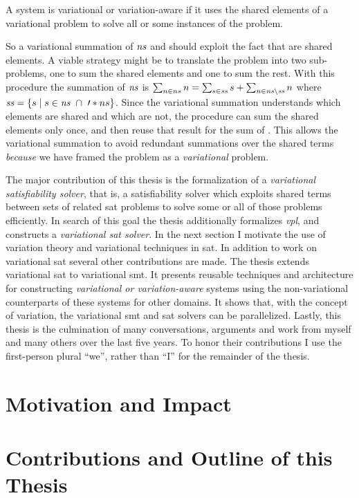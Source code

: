 \begin{definition}
  A system is variational or variation-aware if it uses the shared elements of a
  variational problem to solve all or some instances of the problem.
\end{definition}
%
So a variational summation of $\mathit{ns}$ and  should exploit the fact
that  are shared elements. A viable strategy might be to translate
the problem into two sub-problems, one to sum the shared elements and one to sum
the rest. With this procedure the summation of $\mathit{ns}$ is $\sum_{n \in{} ns} n
= \sum_{s \in{} \mathit{ss}} s + \sum_{n \in{} \mathit{ns} \setminus{} \mathit{ss}} n$ where
$\kf{ss} = \setc{s}{s \in{} \kf{ns}\ \cap{}\ \prime*{ns}}$. Since the
variational summation understands which elements are shared and which are not,
the procedure can sum the shared elements only once, and then reuse that result
for the sum of . This allows the variational summation to avoid
redundant summations over the shared terms \emph{because} we have framed the
problem as a \emph{variational} problem.

The major contribution of this thesis is the formalization of a
\emph{variational satisfiability solver}, that is, a satisfiability solver which
exploits shared terms between sets of related \acl{sat} problems to solve some
or all of those problems efficiently. In search of this goal the thesis
additionally formalizes \emph{\acl{vpl}}, and constructs a \emph{variational
  \ac{sat} solver}. In the next section I motivate the use of variation theory
and variational techniques in \acl{sat}. In addition to work on variational
\ac{sat} several other contributions are made. The thesis extends variational
\acl{sat} to variational \ac{smt}. It presents reusable techniques and
architecture for constructing \emph{variational or variation-aware} systems
using the non-variational counterparts of these systems for other domains. It
shows that, with the concept of variation, the variational \ac{smt} and \ac{sat}
solvers can be parallelized. Lastly, this thesis is the culmination of many
conversations, arguments and work from myself and many others over the last five
years. To honor their contributions I use the first-person plural ``we'', rather
than ``I'' for the remainder of the thesis.

\section{Motivation and Impact}


\section{Contributions and Outline of this Thesis}


